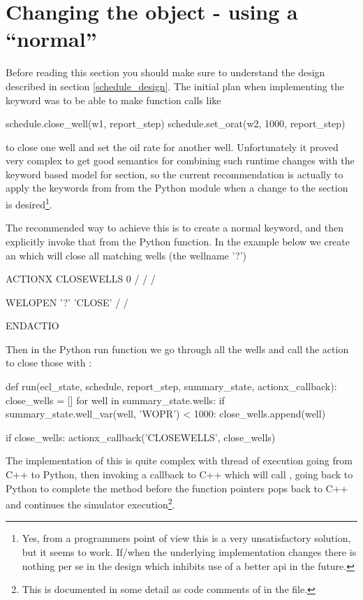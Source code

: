 \section{Changing the  object - using a ``normal'' \actionx{}}
\label{pyaction_actionx}
Before reading this section you should make sure to understand the
 design described in section \ref{schedule_design}. The
initial plan when implementing the \pyaction{} keyword was to be able to make
function calls like
\begin{code}
  schedule.close_well(w1, report_step)
  schedule.set_orat(w2, 1000, report_step)
\end{code}
to close one well and set the oil rate for another well. Unfortunately it proved
very complex to get good semantics for combining such runtime changes with the
keyword based model for  section, so the current recommendation is
actually to apply the keywords from  from the Python module when a
change to the  section is desired\footnote{Yes, from a programmers
point of view this is a very unsatisfactory solution, but it seems to work.
If/when the underlying  implementation changes there is
nothing per se in the \pyaction{} design which inhibits use of a better
 api in the future.}.

The recommended way to achieve this is to create a normal \actionx{} keyword,
and then explicitly invoke that from the Python  function. In
the example below we create an \actionx{}  which will
close all matching wells (the wellname '?')
\begin{deck}
ACTIONX
  CLOSEWELLS 0 /
  /
/

WELOPEN
  '?' 'CLOSE' /
/

ENDACTIO
\end{deck}
Then in the Python run function we go through all the wells and call the
 action to close those with :
\begin{code}
def run(ecl_state, schedule, report_step, summary_state, actionx_callback):
    close_wells = []
    for well in summary_state.wells:
        if summary_state.well_var(well, 'WOPR') < 1000:
           close_wells.append(well)

    if close_wells:
        actionx_callback('CLOSEWELLS', close_wells)
\end{code}
The implementation of this is quite complex with thread of execution going from
C++ to Python, then invoking a callback to C++ which will call
, going back to Python to
complete the  method before the function pointers pops back to
C++ and continues the simulator execution\footnote{This is documented in some
detail as code comments of  in the
 file.}.

